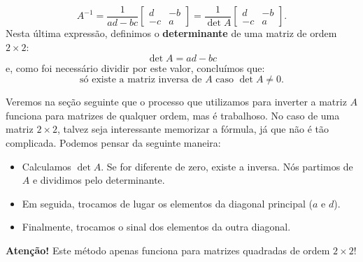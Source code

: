 \begin{equation}
\boxed{A^{-1} = \frac{1}{ad - bc} \left[
	\begin{array}{cc}
	d  & -b  \\
	-c & a 
	\end{array}
	\right] =
	\frac{1}{\det A} \left[
	\begin{array}{cc}
	d  & -b  \\
	-c & a 
	\end{array}
	\right].}
\end{equation} Nesta última expressão, definimos o \textbf{determinante} de uma matriz de ordem $2\times 2$:
\begin{equation}
\det A = ad - bc
\end{equation} e, como foi necessário dividir por este valor, concluímos que:
\begin{equation}
\boxed{\text{só existe a matriz inversa de $A$ caso $\det A \neq 0$.}}
\end{equation}


\begin{obs}
	Veremos na seção seguinte que o processo que utilizamos para inverter a matriz $A$ funciona para matrizes de qualquer ordem, mas é trabalhoso. No caso de uma matriz $2\times 2$, talvez seja interessante memorizar a fórmula, já que não é tão complicada. Podemos pensar da seguinte maneira:
	\begin{itemize}
		\item Calculamos $\det A$. Se for diferente de zero, existe a inversa. Nós partimos de $A$ e dividimos pelo determinante.
		\item Em seguida, trocamos de lugar os elementos da diagonal principal ($a$ e $d$).
		\item Finalmente, trocamos o sinal dos elementos da outra diagonal.
	\end{itemize}
	\textbf{Atenção!} Este método apenas funciona para matrizes quadradas de ordem $2\times 2$!
\end{obs}

